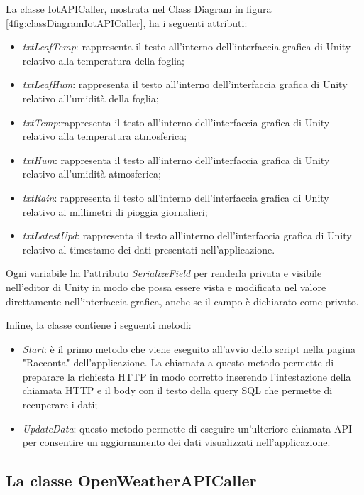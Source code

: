 La classe IotAPICaller, mostrata nel Class Diagram in figura \ref{4fig:classDiagramIotAPICaller}, ha i seguenti attributi:

\begin{itemize}
    \item \textit{txtLeafTemp}: rappresenta il testo all'interno dell'interfaccia grafica di Unity relativo alla temperatura della foglia; 
    \item \textit{txtLeafHum}: rappresenta il testo all'interno dell'interfaccia grafica di Unity relativo all'umidità della foglia;
    \item \textit{txtTemp}:rappresenta il testo all'interno dell'interfaccia grafica di Unity relativo alla temperatura atmosferica;
    \item \textit{txtHum}: rappresenta il testo all'interno dell'interfaccia grafica di Unity relativo all'umidità atmosferica;
    \item \textit{txtRain}: rappresenta il testo all'interno dell'interfaccia grafica di Unity relativo ai millimetri di pioggia giornalieri;
    \item \textit{txtLatestUpd}: rappresenta il testo all'interno dell'interfaccia grafica di Unity relativo al timestamo dei dati presentati nell'applicazione.
\end{itemize}

Ogni variabile ha l'attributo \textit{SerializeField} per renderla privata e visibile nell'editor di Unity in modo che possa essere vista e modificata nel valore direttamente nell'interfaccia grafica, anche se il campo è dichiarato come privato.

Infine, la classe contiene i seguenti metodi:

\begin{itemize}
    \item \textit{Start}: è il primo metodo che viene eseguito all'avvio dello script nella pagina "Racconta" dell'applicazione. La chiamata a questo metodo permette di preparare la richiesta HTTP in modo corretto inserendo l'intestazione della chiamata HTTP e il body con il testo della query SQL che permette di recuperare i dati;
    \item \textit{UpdateData}: questo metodo permette di eseguire un'ulteriore chiamata API per consentire un aggiornamento dei dati visualizzati nell'applicazione.
\end{itemize}

\subsection{La classe OpenWeatherAPICaller}

